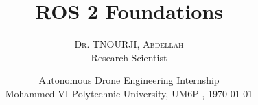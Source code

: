 \title[Short title here]{ROS 2 Foundations}
\author{%
    {\textsc{Dr. TNOURJI, Abdellah}} \\[0.5ex]
    Research Scientist %
}
\date{Autonomous Drone Engineering Internship\\Mohammed VI Polytechnic University, UM6P   , \today} 

